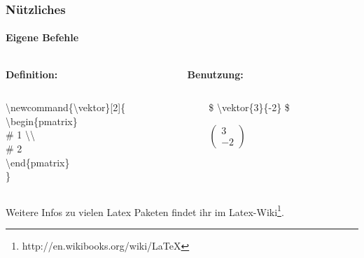 \begin{frame}
\frametitle{Nützliches}
\framesubtitle{Eigene Befehle}
\begin{columns}
\begin{column}{0.5\textwidth}
\textbf{Definition:}\\
\end{column}
\begin{column}{0.5\textwidth}
\textbf{Benutzung:}\\
\end{column}
\end{columns}
\bigskip
\begin{columns}
\begin{column}{0.5\textwidth}
\begin{ttfamily}{\normalsize
\color{nounibaredI}\textbackslash newcommand\color{black}\{\textbackslash vektor\}[2]\{\\
\color{unibablueI}\textbackslash begin\color{black}\{pmatrix\}\\
\color{unibayellowI}\# 1 \color{nounibaredI}\textbackslash \textbackslash\\
\color{unibayellowI} \# 2\\
\color{unibablueI}\textbackslash end\color{black}\{pmatrix\}\\
\}\\
}
\end{ttfamily}
\end{column}
\begin{column}{0.5\textwidth}
\begin{ttfamily}{\normalsize
\color{unibayellowI}\$ \color{nounibaredI}\textbackslash vektor\color{black}\{3\}\{-2\} \color{unibayellowI}\$ \\}
\end{ttfamily}
\medskip
$
\begin{pmatrix}
3 \\ -2
\end{pmatrix}
$
\end{column}
\end{columns}
\bigskip
Weitere Infos zu vielen Latex Paketen findet ihr im Latex-Wiki\footnote{http://en.wikibooks.org/wiki/LaTeX}.\\
\end{frame}

